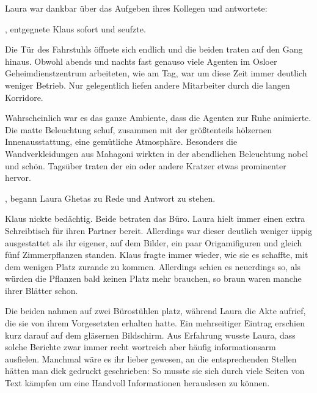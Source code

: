 Laura war dankbar über das Aufgeben ihres Kollegen und antwortete: 

\par

, entgegnete Klaus sofort und seufzte.

\par

Die Tür des Fahrstuhls öffnete sich endlich und die beiden traten auf den Gang hinaus.
Obwohl abends und nachts fast genauso viele Agenten im Osloer Geheimdienstzentrum arbeiteten, wie am Tag, war um diese Zeit immer deutlich weniger Betrieb.
Nur gelegentlich liefen andere Mitarbeiter durch die langen Korridore.

\par

Wahrscheinlich war es das ganze Ambiente, dass die Agenten zur Ruhe animierte.
Die matte Beleuchtung schuf, zusammen mit der größtenteils hölzernen Innenausstattung, eine gemütliche Atmosphäre.
Besonders die Wandverkleidungen aus Mahagoni wirkten in der abendlichen Beleuchtung nobel und schön.
Tagsüber traten der ein oder andere Kratzer etwas prominenter hervor.

\par

, begann Laura Ghetas zu Rede und Antwort zu stehen.

\par

Klaus nickte bedächtig.
Beide betraten das Büro.
Laura hielt immer einen extra Schreibtisch für ihren Partner bereit.
Allerdings war dieser deutlich weniger üppig ausgestattet als ihr eigener, auf dem Bilder, ein paar Origamifiguren und gleich fünf Zimmerpflanzen standen.
Klaus fragte immer wieder, wie sie es schaffte, mit dem wenigen Platz zurande zu kommen.
Allerdings schien  es neuerdings so, als würden die Pflanzen bald keinen Platz mehr brauchen, so braun waren manche ihrer Blätter schon.

\par

Die beiden nahmen auf zwei Bürostühlen platz, während Laura die Akte aufrief, die sie von ihrem Vorgesetzten erhalten hatte.
Ein mehrseitiger Eintrag erschien kurz darauf auf dem gläsernen Bildschirm.
Aus Erfahrung wusste Laura, dass solche Berichte zwar immer recht wortreich aber häufig informationsarm ausfielen.
Manchmal wäre es ihr lieber gewesen, an die entsprechenden Stellen hätten man dick gedruckt geschrieben: 
So musste sie sich durch viele Seiten von Text kämpfen um eine Handvoll Informationen herauslesen zu können.

